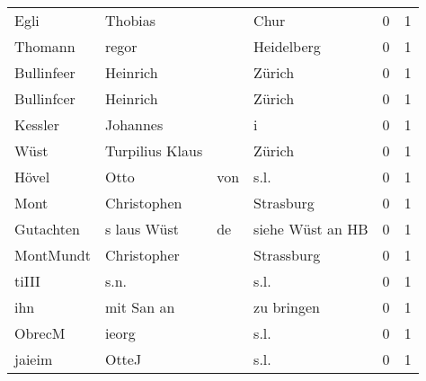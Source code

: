 \begin{tabular}{llllrr}
                     Egli &                            Thobias &             &                                        Chur &          0 &         1 \\
                  Thomann &                              regor &             &                                  Heidelberg &          0 &         1 \\
               Bullinfeer &                           Heinrich &             &                                      Zürich &          0 &         1 \\
               Bullinfcer &                           Heinrich &             &                                      Zürich &          0 &         1 \\
                  Kessler &                           Johannes &             &                                           i &          0 &         1 \\
                     Wüst &                    Turpilius Klaus &             &                                      Zürich &          0 &         1 \\
                    Hövel &                               Otto &         von &                                        s.l. &          0 &         1 \\
                     Mont &                        Christophen &             &                                   Strasburg &          0 &         1 \\
                Gutachten &                        s laus Wüst &          de &                            siehe Wüst an HB &          0 &         1 \\
                MontMundt &                        Christopher &             &                                  Strassburg &          0 &         1 \\
                    tiIII &                               s.n. &             &                                        s.l. &          0 &         1 \\
                      ihn &                         mit San an &             &                                  zu bringen &          0 &         1 \\
                   ObrecM &                              ieorg &             &                                        s.l. &          0 &         1 \\
                   jaieim &                              OtteJ &             &                                        s.l. &          0 &         1 \\

\end{tabular}
